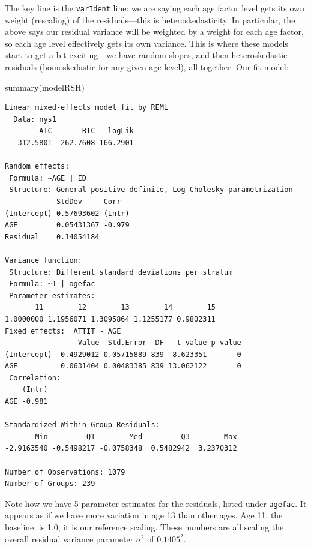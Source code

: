 \documentclass[
  letterpaper,
  DIV=11,
  numbers=noendperiod]{scrreprt}
\newenvironment{Shaded}{\begin{snugshade}}{\end{snugshade}}
\newcommand{\FunctionTok}[1]{\textcolor[rgb]{0.02,0.16,0.49}{#1}}
\newcommand{\NormalTok}[1]{\textcolor[rgb]{0.00,0.44,0.13}{#1}}
\begin{document}
The key line is the \texttt{varIdent} line: we are saying each age
factor level gets its own weight (rescaling) of the residuals---this is
heteroskedasticity. In particular, the above says our residual variance
will be weighted by a weight for each age factor, so each age level
effectively gets its own variance. This is where these models start to
get a bit exciting---we have random slopes, and then heteroskedastic
residuals (homoskedastic for any given age level), all together. Our fit
model:

\begin{Shaded}
\begin{Highlighting}[]
\FunctionTok{summary}\NormalTok{(modelRSH)}
\end{Highlighting}
\end{Shaded}

\begin{verbatim}
Linear mixed-effects model fit by REML
  Data: nys1 
        AIC       BIC   logLik
  -312.5801 -262.7608 166.2901

Random effects:
 Formula: ~AGE | ID
 Structure: General positive-definite, Log-Cholesky parametrization
            StdDev     Corr  
(Intercept) 0.57693602 (Intr)
AGE         0.05431367 -0.979
Residual    0.14054184       

Variance function:
 Structure: Different standard deviations per stratum
 Formula: ~1 | agefac 
 Parameter estimates:
       11        12        13        14        15 
1.0000000 1.1956071 1.3095864 1.1255177 0.9802311 
Fixed effects:  ATTIT ~ AGE 
                 Value  Std.Error  DF   t-value p-value
(Intercept) -0.4929012 0.05715889 839 -8.623351       0
AGE          0.0631404 0.00483385 839 13.062122       0
 Correlation: 
    (Intr)
AGE -0.981

Standardized Within-Group Residuals:
       Min         Q1        Med         Q3        Max 
-2.9163540 -0.5498217 -0.0758348  0.5482942  3.2370312 

Number of Observations: 1079
Number of Groups: 239 
\end{verbatim}

Note how we have 5 parameter estimates for the residuals, listed under
\texttt{agefac}. It appears as if we have more variation in age 13 than
other ages. Age 11, the baseline, is 1.0; it is our reference scaling.
These numbers are all scaling the overall residual variance parameter
\(\sigma^2\) of \(0.1405^2\).
\end{document}

